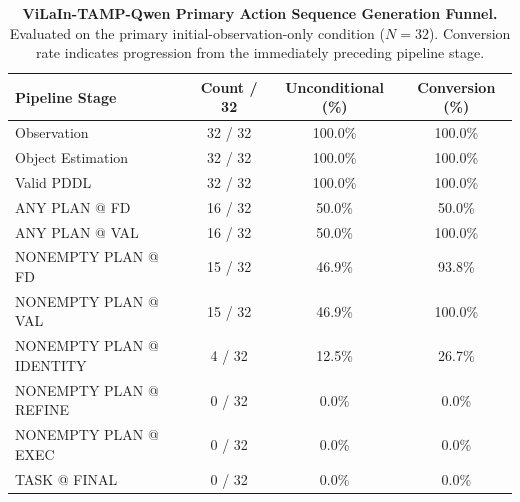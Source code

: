 \begin{table}[t]
\centering
\small
\caption{\textbf{ViLaIn-TAMP-Qwen Primary Action Sequence Generation Funnel.}
Evaluated on the primary initial-observation-only condition ($N=32$).
Conversion rate indicates progression from the immediately preceding pipeline stage.}
\label{tab:vilain_primary_funnel}
\begin{tabular}{l|cc|c}
\hline
\textbf{Pipeline Stage} & \textbf{Count / 32} & \textbf{Unconditional (\%)} & \textbf{Conversion (\%)} \\
\hline
Observation & 32 / 32 & 100.0\% & 100.0\% \\
Object Estimation & 32 / 32 & 100.0\% & 100.0\% \\
Valid PDDL & 32 / 32 & 100.0\% & 100.0\% \\
ANY PLAN @ FD & 16 / 32 & 50.0\% & 50.0\% \\
ANY PLAN @ VAL & 16 / 32 & 50.0\% & 100.0\% \\
NONEMPTY PLAN @ FD & 15 / 32 & 46.9\% & 93.8\% \\
NONEMPTY PLAN @ VAL & 15 / 32 & 46.9\% & 100.0\% \\
NONEMPTY PLAN @ IDENTITY & 4 / 32 & 12.5\% & 26.7\% \\
NONEMPTY PLAN @ REFINE & 0 / 32 & 0.0\% & 0.0\% \\
NONEMPTY PLAN @ EXEC & 0 / 32 & 0.0\% & 0.0\% \\
TASK @ FINAL & 0 / 32 & 0.0\% & 0.0\% \\
\hline
\end{tabular}
\end{table}

